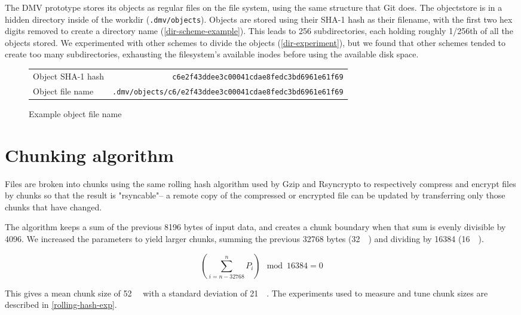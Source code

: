 The \gls{DMV} prototype stores its objects as regular files on the file system,
using the same structure that Git does. The \gls{objectstore} is in a hidden
directory inside of the \gls{workdir} (\lstinline{.dmv/objects}). Objects are
stored using their SHA-1 hash as their filename, with the first two hex digits
removed to create a directory name (\autoref{dir-scheme-example}). This leads to
\num{256} subdirectories, each holding roughly \num{1/256}th of all the objects
stored. We experimented with other schemes to divide the objects
(\autoref{dir-experiment}), but we found that other schemes tended to create too
many subdirectories, exhausting the filesystem's available inodes before using
the available disk space.

\begin{figure}[h]
    \caption{Example object file name}
    \label{dir-scheme-example}
    \begin{tabular}{ l r }
        Object SHA-1 hash & \lstinline{c6e2f43ddee3c00041cdae8fedc3bd6961e61f69} \\
        Object file name & \lstinline{.dmv/objects/c6/e2f43ddee3c00041cdae8fedc3bd6961e61f69} \\
    \end{tabular}
\end{figure}

%


\section{Chunking algorithm}\label{chunking-algoritm}

Files are broken into chunks using the same rolling hash algorithm used by Gzip
and Rsyncrypto\cite{rsyncrypto_algorithm} to respectively compress and encrypt
files by chunks so that the result is "rsyncable"-- a remote copy of the
compressed or encrypted file can be updated by transferring only those chunks
that have changed.

The algorithm keeps a sum of the previous \num{8196} bytes of input data, and
creates a chunk boundary when that sum is evenly divisible by \num{4096}. We
increased the parameters to yield larger chunks, summing the previous
\num{32768} bytes (\SI{32}{\kibi\byte}) and dividing by \num{16384}
(\SI{16}{\kibi\relax}).

\begin{equation*}
    \left( \sum_{i = n - \num{32768} }^{n}{P_i} \right) \mod \num{16384} = 0
\end{equation*}

This gives a mean chunk size of \SI{52}{\kibi\byte} with a standard deviation of
\SI{21}{\kibi\byte}. The experiments used to measure and tune chunk sizes are
described in \autoref{rolling-hash-exp}.

